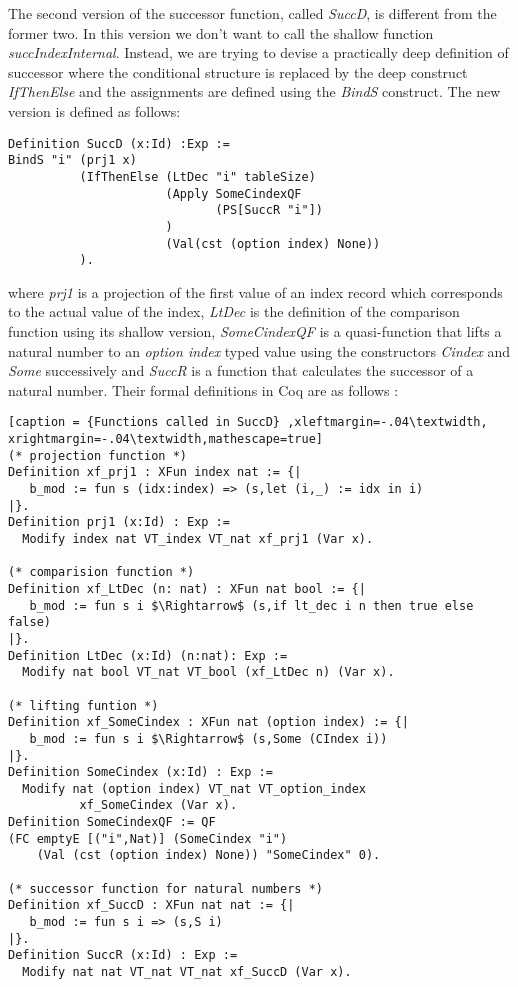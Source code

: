 The second version of the successor function, called \textit{SuccD}, is different from the former two. In this version we don't want to call the shallow function \textit{succIndexInternal}. Instead, we are trying to devise a practically deep definition of successor where the conditional structure is replaced by the deep construct \textit{IfThenElse} and the assignments are defined using the \textit{BindS} construct. The new version is defined as follows: 
\begin{lstlisting}[caption = {Definition of SuccD}]
Definition SuccD (x:Id) :Exp :=
BindS "i" (prj1 x) 
          (IfThenElse (LtDec "i" tableSize) 
                      (Apply SomeCindexQF
                             (PS[SuccR "i"])
                      ) 
                      (Val(cst (option index) None))
          ).
\end{lstlisting} \vspace{4pt}
where \textit{prj1} is a projection of the first value of an index record which corresponds to the actual value of the index, \textit{LtDec} is the definition of the comparison function using its shallow version, \textit{SomeCindexQF} is a quasi-function that lifts a natural number to an \textit{option index} typed value using the constructors \textit{Cindex} and \textit{Some} successively and \textit{SuccR} is a function that calculates the successor of a natural number. Their formal definitions in Coq are as follows :  
\begin{lstlisting}[caption = {Functions called in SuccD} ,xleftmargin=-.04\textwidth,
xrightmargin=-.04\textwidth,mathescape=true]
(* projection function *)
Definition xf_prj1 : XFun index nat := {|
   b_mod := fun s (idx:index) => (s,let (i,_) := idx in i)
|}.
Definition prj1 (x:Id) : Exp :=
  Modify index nat VT_index VT_nat xf_prj1 (Var x). 
  
(* comparision function *)
Definition xf_LtDec (n: nat) : XFun nat bool := {|
   b_mod := fun s i $\Rightarrow$ (s,if lt_dec i n then true else false)
|}.
Definition LtDec (x:Id) (n:nat): Exp :=
  Modify nat bool VT_nat VT_bool (xf_LtDec n) (Var x). 

(* lifting funtion *)
Definition xf_SomeCindex : XFun nat (option index) := {|
   b_mod := fun s i $\Rightarrow$ (s,Some (CIndex i))
|}.
Definition SomeCindex (x:Id) : Exp :=
  Modify nat (option index) VT_nat VT_option_index  
  	      xf_SomeCindex (Var x).
Definition SomeCindexQF := QF 
(FC emptyE [("i",Nat)] (SomeCindex "i") 
    (Val (cst (option index) None)) "SomeCindex" 0).

(* successor function for natural numbers *)
Definition xf_SuccD : XFun nat nat := {|
   b_mod := fun s i => (s,S i)
|}.
Definition SuccR (x:Id) : Exp :=
  Modify nat nat VT_nat VT_nat xf_SuccD (Var x).
\end{lstlisting} 

